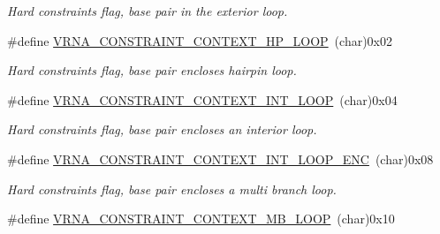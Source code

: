 \begin{DoxyCompactItemize}
\begin{DoxyCompactList}\small\item\em Hard constraints flag, base pair in the exterior loop. \end{DoxyCompactList}\item 
\hypertarget{group__hard__constraints_ga79203702b197b6b9d3b78eed40663eb1}{}\#define \hyperlink{group__hard__constraints_ga79203702b197b6b9d3b78eed40663eb1}{V\+R\+N\+A\+\_\+\+C\+O\+N\+S\+T\+R\+A\+I\+N\+T\+\_\+\+C\+O\+N\+T\+E\+X\+T\+\_\+\+H\+P\+\_\+\+L\+O\+O\+P}~(char)0x02\label{group__hard__constraints_ga79203702b197b6b9d3b78eed40663eb1}

\begin{DoxyCompactList}\small\item\em Hard constraints flag, base pair encloses hairpin loop. \end{DoxyCompactList}\item 
\hypertarget{group__hard__constraints_ga21feeab3a9e5fa5a9e3d9ac0fcf5994f}{}\#define \hyperlink{group__hard__constraints_ga21feeab3a9e5fa5a9e3d9ac0fcf5994f}{V\+R\+N\+A\+\_\+\+C\+O\+N\+S\+T\+R\+A\+I\+N\+T\+\_\+\+C\+O\+N\+T\+E\+X\+T\+\_\+\+I\+N\+T\+\_\+\+L\+O\+O\+P}~(char)0x04\label{group__hard__constraints_ga21feeab3a9e5fa5a9e3d9ac0fcf5994f}

\begin{DoxyCompactList}\small\item\em Hard constraints flag, base pair encloses an interior loop. \end{DoxyCompactList}\item 
\hypertarget{group__hard__constraints_ga0536288e04ff6332ecdc23ca4705402b}{}\#define \hyperlink{group__hard__constraints_ga0536288e04ff6332ecdc23ca4705402b}{V\+R\+N\+A\+\_\+\+C\+O\+N\+S\+T\+R\+A\+I\+N\+T\+\_\+\+C\+O\+N\+T\+E\+X\+T\+\_\+\+I\+N\+T\+\_\+\+L\+O\+O\+P\+\_\+\+E\+N\+C}~(char)0x08\label{group__hard__constraints_ga0536288e04ff6332ecdc23ca4705402b}

\begin{DoxyCompactList}\small\item\em Hard constraints flag, base pair encloses a multi branch loop. \end{DoxyCompactList}\item 
\hypertarget{group__hard__constraints_ga456ecd2ff00056bb64da8dd4f61bbfc5}{}\#define \hyperlink{group__hard__constraints_ga456ecd2ff00056bb64da8dd4f61bbfc5}{V\+R\+N\+A\+\_\+\+C\+O\+N\+S\+T\+R\+A\+I\+N\+T\+\_\+\+C\+O\+N\+T\+E\+X\+T\+\_\+\+M\+B\+\_\+\+L\+O\+O\+P}~(char)0x10\label{group__hard__constraints_ga456ecd2ff00056bb64da8dd4f61bbfc5}


\end{DoxyCompactItemize}
